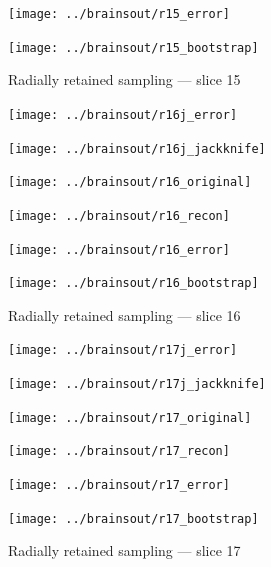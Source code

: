 \documentclass[article]{jdssv}
\begin{document}
\begin{appendix}
\begin{figure}
\begin{centering}
\parbox{\imsize}{\texttt{[image: ../brainsout/r15\_error]}}
\parbox{\imsize}{\texttt{[image: ../brainsout/r15\_bootstrap]}}

\end{centering}
\caption{Radially retained sampling --- slice 15}
\end{figure}


\begin{figure}
\begin{centering}

\parbox{\imsize}{\texttt{[image: ../brainsout/r16j\_error]}}
\parbox{\imsize}{\texttt{[image: ../brainsout/r16j\_jackknife]}}

\vspace{\vertsep}

\parbox{\imsize}{\texttt{[image: ../brainsout/r16\_original]}}
\parbox{\imsize}{\texttt{[image: ../brainsout/r16\_recon]}}

\vspace{\vertsep}

\parbox{\imsize}{\texttt{[image: ../brainsout/r16\_error]}}
\parbox{\imsize}{\texttt{[image: ../brainsout/r16\_bootstrap]}}

\end{centering}
\caption{Radially retained sampling --- slice 16}
\end{figure}


\begin{figure}
\begin{centering}

\parbox{\imsize}{\texttt{[image: ../brainsout/r17j\_error]}}
\parbox{\imsize}{\texttt{[image: ../brainsout/r17j\_jackknife]}}

\vspace{\vertsep}

\parbox{\imsize}{\texttt{[image: ../brainsout/r17\_original]}}
\parbox{\imsize}{\texttt{[image: ../brainsout/r17\_recon]}}

\vspace{\vertsep}

\parbox{\imsize}{\texttt{[image: ../brainsout/r17\_error]}}
\parbox{\imsize}{\texttt{[image: ../brainsout/r17\_bootstrap]}}

\end{centering}
\caption{Radially retained sampling --- slice 17}
\end{figure}


\begin{figure}
\begin{centering}


\end{centering}
\end{figure}
\end{appendix}
\end{document}
